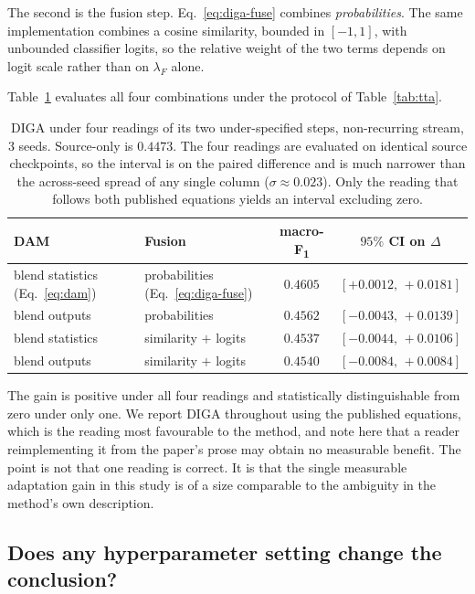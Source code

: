 \documentclass[a4paper,fleqn]{cas-dc}
\newcommand{\macf}{macro-F\textsubscript{1}}
\begin{document}
The second is the fusion step. Eq.~\ref{eq:diga-fuse} combines \emph{probabilities}. The
same implementation combines a cosine similarity, bounded in $[-1,1]$, with unbounded
classifier logits, so the relative weight of the two terms depends on logit scale rather
than on $\lambda_F$ alone.

Table~\ref{tab:digaimpl} evaluates all four combinations under the protocol of
Table~\ref{tab:tta}.

\begin{table}[t]
\centering
\caption{DIGA under four readings of its two under-specified steps, non-recurring stream,
3 seeds. Source-only is $0.4473$. The four readings are evaluated on identical source
checkpoints, so the interval is on the paired difference and is much narrower than the
across-seed spread of any single column ($\sigma\approx0.023$). Only the reading that
follows both published equations yields an interval excluding zero.}
\label{tab:digaimpl}
\small
\begin{tabular}{llcc}
\toprule
DAM & Fusion & \macf & $95\%$ CI on $\Delta$ \\
\midrule
blend statistics (Eq.~\ref{eq:dam}) & probabilities (Eq.~\ref{eq:diga-fuse}) & $\mathbf{0.4605}$ & $[+0.0012,\,+0.0181]$ \\
blend outputs & probabilities & $0.4562$ & $[-0.0043,\,+0.0139]$ \\
blend statistics & similarity $+$ logits & $0.4537$ & $[-0.0044,\,+0.0106]$ \\
blend outputs & similarity $+$ logits & $0.4540$ & $[-0.0084,\,+0.0084]$ \\
\bottomrule
\end{tabular}
\end{table}

The gain is positive under all four readings and statistically distinguishable from zero
under only one. We report DIGA throughout using the published equations, which is the
reading most favourable to the method, and note here that a reader reimplementing it from
the paper's prose may obtain no measurable benefit. The point is not that one reading is
correct. It is that the single measurable adaptation gain in this study is of a size
comparable to the ambiguity in the method's own description.

\subsection{Does any hyperparameter setting change the conclusion?}
\label{sec:res-hgrid}
\end{document}
